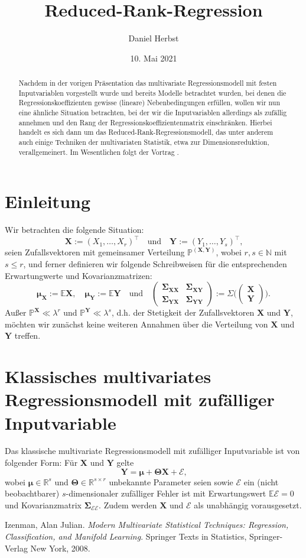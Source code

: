 \documentclass[]{article}
\title{Reduced-Rank-Regression}
\author{Daniel Herbst}
\date{10. Mai 2021}
\newcommand{\Pb}{\mathbb{P}}
\newcommand{\E}{\mathbb{E}}
\newcommand{\R}{\mathbb{R}}
\newcommand{\N}{\mathbb{N}}
\newcommand{\X}{\mathbf{X}}
\newcommand{\Y}{\mathbf{Y}}
\newcommand{\T}{\mathbf{\Theta}}
\newcommand{\muu}{\bm{\mu}}
\newcommand{\Ssigma}{\mathbf{\Sigma}}
\begin{document}
\maketitle

\begin{abstract}
Nachdem in der vorigen Präsentation das multivariate Regressionsmodell mit festen Inputvariablen vorgestellt wurde und 
bereits Modelle betrachtet wurden, bei denen die Regressionskoeffizienten gewisse (lineare) Nebenbedingungen
erfüllen, wollen wir nun eine ähnliche Situation betrachten, bei der wir die Inputvariablen allerdings als
zufällig annehmen und den Rang der Regressionskoeffizientenmatrix einschränken. Hierbei handelt es sich dann um das
Reduced-Rank-Regressionsmodell, das unter anderem auch einige Techniken der multivariaten Statistik, etwa zur Dimensionsreduktion, 
verallgemeinert. Im Wesentlichen folgt der Vortrag 
\cite[Kapitel 6.3]{Izenman}.
\end{abstract}

\section{Einleitung}
Wir betrachten die folgende Situation:
$$\X := (X_1, \dots, X_r)^\top \quad \text{und} \quad \Y := (Y_1, \dots, Y_s)^\top \text{,}$$
seien Zufallsvektoren mit gemeinsamer Verteilung $\Pb^{(\X, \Y)}$, wobei $r, s \in \N$ mit $s \leq r$,
und ferner definieren wir folgende Schreibweisen für die entsprechenden Erwartungwerte und Kovarianzmatrizen:
$$ \muu_\X := \E\X, \quad \muu_\Y := \E\Y \quad \text{und} \quad \begin{pmatrix}
	\Ssigma_{\X\X} & \Ssigma_{\X\Y} \\
	\Ssigma_{\Y\X} & \Ssigma_{\Y\Y}
\end{pmatrix} := \Sigma \biggl(\begin{pmatrix}
\X \\
\Y
\end{pmatrix}\biggr).$$
Außer $\Pb^\X \ll \lambda^r$ und $\Pb^\Y \ll \lambda^s$, d.h. der Stetigkeit der Zufallsvektoren $\X$ und $\Y$, möchten wir zunächst keine
weiteren Annahmen über die Verteilung von $\X$ und $\Y$ treffen.

\section{Klassisches multivariates Regressionsmodell mit zufälliger Inputvariable}
Das klassische multivariate Regressionsmodell mit zufälliger Inputvariable ist von folgender Form: Für $\X$ und $\Y$ gelte
$$ \Y = \muu + \T \X + \mathcal{E} \text{,} $$
wobei $\muu \in \R^s$ und $\T \in \R^{s \times r}$ unbekannte Parameter seien sowie $\mathcal{E}$ ein (nicht beobachtbarer) $s$-dimensionaler zufälliger Fehler ist mit Erwartungswert $\E \mathcal{E} = 0$ und Kovarianzmatrix $\Ssigma_{\mathcal{E} \mathcal{E}}$. Zudem werden $\X$ und
$\mathcal{E}$ als unabhängig vorausgesetzt.




\newpage

\begin{thebibliography}{9}
	Izenman, Alan Julian.
	\textit{Modern Multivariate Statistical Techniques: Regression, Classification, and Manifold Learning}. 
	Springer Texts in Statistics, Springer-Verlag New York, 2008.
\end{thebibliography}
\end{document}
